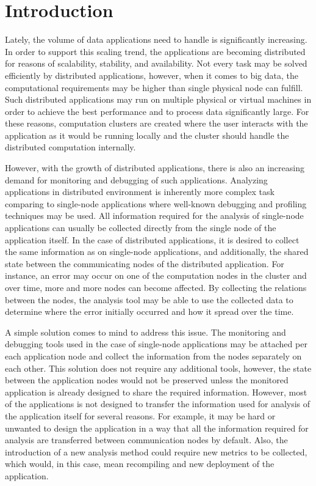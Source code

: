 \chapter{Introduction}
Lately, the volume of data applications need to handle is significantly increasing. In order to support this scaling trend, the applications are becoming distributed for reasons of scalability, stability, and availability. Not every task may be solved efficiently by distributed applications, however, when it comes to big data, the computational requirements may be higher than single physical node can fulfill. Such distributed applications may run on multiple physical or virtual machines in order to achieve the best performance and to process data significantly large. For these reasons, computation clusters are created where the user interacts with the application as it would be running locally and the cluster should handle the distributed computation internally.

However, with the growth of distributed applications, there is also an increasing demand for monitoring and debugging of such applications. Analyzing applications in distributed environment is inherently more complex task comparing to single-node applications where well-known debugging and profiling techniques may be used. All information required for the analysis of single-node applications can usually be collected directly from the single node of the application itself. In the case of distributed applications, it is desired to collect the same information as on single-node applications, and additionally, the shared state between the communicating nodes of the distributed application. For instance, an error may occur on one of the computation nodes in the cluster and over time, more and more nodes can become affected. By collecting the relations between the nodes, the analysis tool may be able to use the collected data to determine where the error initially occurred and how it spread over the time. 

A simple solution comes to mind to address this issue. The monitoring and debugging tools used in the case of single-node applications may be attached per each application node and collect the information from the nodes separately on each other. This solution does not require any additional tools, however, the state between the application nodes would not be preserved unless the monitored application is already designed to share the required information. However, most of the applications is not designed to transfer the information used for analysis of the application itself for several reasons. For example, it may be hard or unwanted to design the application in a way that all the information required for analysis are transferred between communication nodes by default. Also, the introduction of a new analysis method could require new metrics to be collected, which would, in this case, mean recompiling and new deployment of the application.

